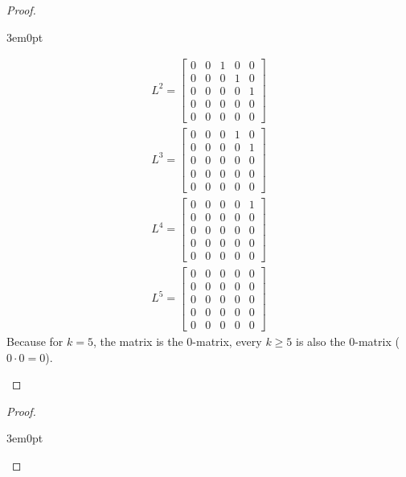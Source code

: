 \documentclass[11pt]{article}
\newenvironment{myproof}
{\begin{proof} \begin{adjustwidth}{3em}{0pt}$ $\par\nobreak\ignorespaces}
{\end{adjustwidth} \end{proof}}
\begin{document}
\begin{flushleft}
\begin{myproof}
\begin{align*}
L^2=
\begin{bmatrix}
0 & 0 & 1 & 0 & 0 \\
0 & 0 & 0 & 1 & 0 \\
0 & 0 & 0 & 0 & 1 \\
0 & 0 & 0 & 0 & 0 \\
0 & 0 & 0 & 0 & 0
\end{bmatrix} \\
L^3=
\begin{bmatrix}
0 & 0 & 0 & 1 & 0 \\
0 & 0 & 0 & 0 & 1 \\
0 & 0 & 0 & 0 & 0 \\
0 & 0 & 0 & 0 & 0 \\
0 & 0 & 0 & 0 & 0
\end{bmatrix} \\
L^4=
\begin{bmatrix}
0 & 0 & 0 & 0 & 1 \\
0 & 0 & 0 & 0 & 0 \\
0 & 0 & 0 & 0 & 0 \\
0 & 0 & 0 & 0 & 0 \\
0 & 0 & 0 & 0 & 0
\end{bmatrix} \\
L^5=
\begin{bmatrix}
0 & 0 & 0 & 0 & 0 \\
0 & 0 & 0 & 0 & 0 \\
0 & 0 & 0 & 0 & 0 \\
0 & 0 & 0 & 0 & 0 \\
0 & 0 & 0 & 0 & 0
\end{bmatrix} 
\end{align*}
Because for $k = 5$, the matrix is the 0-matrix, every $k \geq 5$ is also the 0-matrix ($0 \cdot 0 = 0$).

\end{myproof}

\begin{myproof}


\end{myproof}
\end{flushleft}
\end{document}
